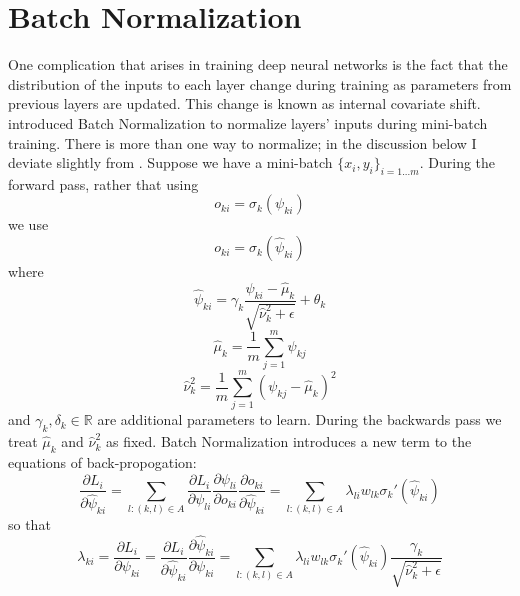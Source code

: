 \documentclass[11pt]{article}
\begin{document}
\section{Batch Normalization}
One complication that arises in training deep neural networks is the fact that the distribution of the inputs to each layer change during training as parameters from previous layers are updated. This change is known as internal covariate shift. \cite{ioffe2015batch} introduced Batch Normalization to normalize layers' inputs during mini-batch training. There is more than one way to normalize; in the discussion below I deviate slightly from \cite{ioffe2015batch}.
Suppose we have a mini-batch $\{ x_i , y_i \}_{i=1...m}$. During the forward pass, rather that using
\begin{equation}
o_{ki} = \sigma_k \left( \psi_{ki} \right)
\end{equation}
we use
\begin{equation}
o_{ki} = \sigma_k \left( \widehat{\psi}_{ki} \right)
\end{equation}
where
\begin{equation}
\widehat{\psi}_{ki} = \gamma_k \frac{\psi_{ki} - \widehat{\mu}_k}{\sqrt{\widehat{\nu}_k^2 + \epsilon}} + \theta_k
\end{equation}
\begin{equation}
\widehat{\mu}_k = \frac{1}{m} \sum_{j=1}^m \psi_{kj}
\end{equation}
\begin{equation}
\widehat{\nu}_k^2 = \frac{1}{m} \sum_{j=1}^m \left( \psi_{kj} - \widehat{\mu}_k \right) ^2
\end{equation}
and $\gamma_k, \delta_k \in \mathbb{R}$ are additional parameters to learn. During the backwards pass we treat $\widehat{\mu}_k$ and $\widehat{\nu}_k^2$ as fixed. Batch Normalization introduces a new term to the equations of back-propogation:
\begin{equation}
\frac{\partial L_i}{\partial \widehat{\psi}_{ki}} = \sum_{l:\left(k,l\right) \in A} \frac{\partial L_i}{\partial \psi_{li}} \frac{\partial \psi_{li}}{\partial o_{ki}} \frac{\partial o_{ki}}{\partial \widehat{\psi}_{ki}} =
\sum_{l:\left(k,l\right) \in A} \lambda_{li} w_{lk} \sigma_k' \left( \widehat{\psi}_{ki} \right)
\end{equation}
so that
\begin{equation} \label{eq21}
\lambda _{ki} = \frac{\partial L_i}{\partial \psi _{ki}}
= \frac{\partial L_i}{\partial \widehat{\psi}_{ki}} \frac{\partial \widehat{\psi}_{ki}}{\partial \psi_{ki}}
= \sum_{l:\left( k,l \right) \in A} \lambda_{li} w_{lk} \sigma_k' \left( \widehat{\psi}_{ki} \right) \frac{\gamma_k}{\sqrt{\widehat{\nu}_k^2 + \epsilon}}
\end{equation}
\end{document}
